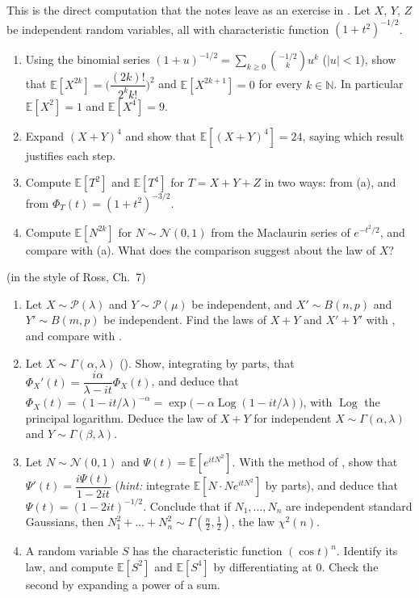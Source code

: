 \begin{exercise}\label{ex:cf-fourth-moment}
\easy This is the direct computation that the notes leave as an exercise in
. Let $X$, $Y$, $Z$ be independent random variables, all with
characteristic function $(1+t^2)^{-1/2}$.
\begin{enumerate}[label=(\alph*)]
  \item Using the binomial series $(1+u)^{-1/2}=\sum_{k\ge0}\binom{-1/2}{k}u^k$ ($|u|<1$), show that
    $\mathbb E[X^{2k}]=\Big(\dfrac{(2k)!}{2^kk!}\Big)^2$ and $\mathbb E[X^{2k+1}]=0$ for every
    $k\in\mathbb N$. In particular $\mathbb E[X^2]=1$ and $\mathbb E[X^4]=9$.
  \item Expand $(X+Y)^4$ and show that $\mathbb E[(X+Y)^4]=24$, saying which result justifies each
    step.
  \item Compute $\mathbb E[T^2]$ and $\mathbb E[T^4]$ for $T=X+Y+Z$ in two ways: from (a), and
    from $\Phi_T(t)=(1+t^2)^{-3/2}$.
  \item Compute $\mathbb E[N^{2k}]$ for $N\sim\mathcal N(0,1)$ from the Maclaurin series of
    $e^{-t^2/2}$, and compare with (a). What does the comparison suggest about the law of $X$?
\end{enumerate}
\end{exercise}

\begin{exercise}\label{ex:cf-sums}
\medium (in the style of Ross, Ch.~7)
\begin{enumerate}[label=(\alph*)]
  \item Let $X\sim\mathcal P(\lambda)$ and $Y\sim\mathcal P(\mu)$ be independent, and
    $X'\sim B(n,p)$ and $Y'\sim B(m,p)$ be independent. Find the laws of $X+Y$ and $X'+Y'$ with
    , and compare with .
  \item Let $X\sim\Gamma(\alpha,\lambda)$ (). Show, integrating by parts,
    that $\Phi_X'(t)=\dfrac{i\alpha}{\lambda-it}\Phi_X(t)$, and deduce that
    $\Phi_X(t)=(1-it/\lambda)^{-\alpha}=\exp\big(-\alpha\operatorname{Log}(1-it/\lambda)\big)$, with
    $\operatorname{Log}$ the principal logarithm. Deduce the law of $X+Y$ for independent
    $X\sim\Gamma(\alpha,\lambda)$ and $Y\sim\Gamma(\beta,\lambda)$.
  \item Let $N\sim\mathcal N(0,1)$ and $\Psi(t)=\mathbb E[e^{itN^2}]$. With the method of
    , show that $\Psi'(t)=\dfrac{i\Psi(t)}{1-2it}$ (\emph{hint:} integrate
    $\mathbb E[N\cdot Ne^{itN^2}]$ by parts), and deduce that $\Psi(t)=(1-2it)^{-1/2}$. Conclude that
    if $N_1,\dots,N_n$ are independent standard Gaussians, then
    $N_1^2+\dots+N_n^2\sim\Gamma(\frac n2,\frac12)$, the law $\chi^2(n)$.
  \item A random variable $S$ has the characteristic function $(\cos t)^n$. Identify its law, and
    compute $\mathbb E[S^2]$ and $\mathbb E[S^4]$ by differentiating at $0$. Check the second by
    expanding a power of a sum.
\end{enumerate}
\end{exercise}


